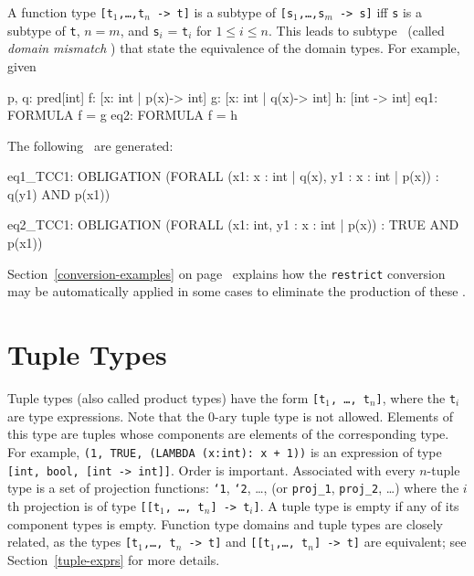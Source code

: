 A function type \texttt{[t$_1$,\ldots,t$_n$ -> t]} is a subtype of
\texttt{[s$_1$,\ldots,s$_m$ -> s]} iff \texttt{s} is a subtype of
\texttt{t}, $n = m$, and \texttt{s$_i$} = \texttt{t$_i$} for $1 \leq i \leq n$.
This leads to subtype \tccs\ (called \emph{domain mismatch
\tccs}) that state
the equivalence of the domain types.  For example, given
\begin{pvsex}
  p, q: pred[int]
  f: [\setb{}x: int | p(x)\sete -> int]
  g: [\setb{}x: int | q(x)\sete -> int]
  h: [int -> int]
  eq1: FORMULA f = g
  eq2: FORMULA f = h
\end{pvsex}
%
The following \tccs\ are generated:
\begin{pvsex}
eq1_TCC1: OBLIGATION
  (FORALL (x1: \setb{}x : int | q(x)\sete, y1 : \setb{}x : int | p(x)\sete) :
     q(y1) AND p(x1))

eq2_TCC1: OBLIGATION
  (FORALL (x1: int, y1 : \setb{}x : int | p(x)\sete) :
     TRUE AND p(x1))
\end{pvsex}

Section~\ref{conversion-examples} on page~\pageref{conversion-examples}
explains how the \texttt{restrict} conversion may be automatically applied
in some cases to eliminate the production of these \tccs.



\section{Tuple Types}\label{tuple-types}

Tuple types (also called product types) have the form \texttt{[t$_1$,
\ldots, t$_n$]}, where the \texttt{t$_i$} are type expressions.  Note that
the 0-ary tuple type is not allowed.  Elements of this type are tuples
whose components are elements of the corresponding type.  For example,
\texttt{(1, TRUE, (LAMBDA (x:int):\ x + 1))} is an expression of type
\texttt{[int, bool, [int -> int]]}.  Order is important.  Associated with
every $n$-tuple type is a set of projection functions: \texttt{`1},
\texttt{`2}, \ldots, (or \texttt{proj\_1}, \texttt{proj\_2}, \ldots) where
the $i$th projection is of type \texttt{[[t$_1$, \ldots, t$_n$] ->
t$_i$]}.  A tuple type is empty if any of its component types is empty.
Function type domains and tuple types are closely related, as the types
\texttt{[t$_1$,\ldots, t$_n$ -> t]} and \texttt{[[t$_1$,\ldots, t$_n$] ->
t]} are equivalent; see Section~\ref{tuple-exprs} for more details.

